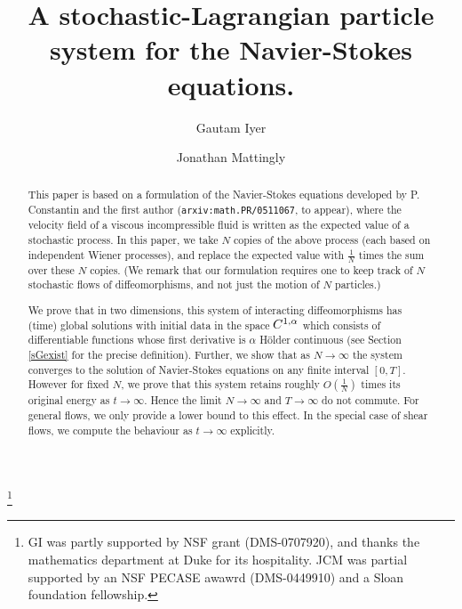 \documentclass[final]{amsart}%
\newcommand{\holderspace}[2]{\ensuremath{C^{\ifx0#1{#2}\else{#1,#2}\fi}}}
\numberwithin{equation}{section}
\theoremstyle{definition}
\theoremstyle{remark}
\begin{document}
\title[A stochastic-Lagrangian particle system for Navier-Stokes]{A
  stochastic-Lagrangian particle system for the Navier-Stokes
  equations.}  \author{Gautam Iyer} \address{%
  Department of Mathematics\\
  Stanford University}   \author{Jonathan Mattingly} \address{%
  Department of Mathematics\\
  Duke University} \thanks{GI was
  partly supported by NSF grant (DMS-0707920), and thanks the
  mathematics department at Duke for its hospitality. JCM was partial
  supported by an NSF PECASE awawrd (DMS-0449910) and a Sloan
  foundation fellowship.} 
\begin{abstract}%
  This paper is based on a formulation of the Navier-Stokes equations
  developed by P. Constantin and the first author
  (\texttt{arxiv:math.PR/0511067}, to appear), where the velocity
  field of a viscous incompressible fluid is written as the expected
  value of a stochastic process. In this paper, we take $N$ copies of
  the above process (each based on independent Wiener processes), and
  replace the expected value with $\frac{1}{N}$ times the sum over
  these $N$ copies. (We remark that our formulation requires one to
  keep track of $N$ stochastic flows of diffeomorphisms, and not just
  the motion of $N$ particles.)

  We prove that in two dimensions, this system of interacting
  diffeomorphisms has (time) global solutions with initial data in the
  space $\holderspace{1}{\alpha}$ which consists of differentiable
  functions whose first derivative is $\alpha$ H\"older continuous
  (see Section \ref{sGexist} for the precise definition). Further, we
  show that as $N \to \infty$ the system converges to the solution of
  Navier-Stokes equations on any finite interval $[0,T]$. However for
  fixed $N$, we prove that this system retains roughly
  $O(\frac{1}{N})$ times its original energy as $t \to \infty$. Hence
  the limit $N \rightarrow \infty$ and $T\rightarrow \infty$ do not
  commute. For general flows, we only provide a lower bound to this
  effect. In the special case of shear flows, we compute the behaviour
  as $t \to \infty$ explicitly.
\end{abstract}%
\maketitle
\end{document}
